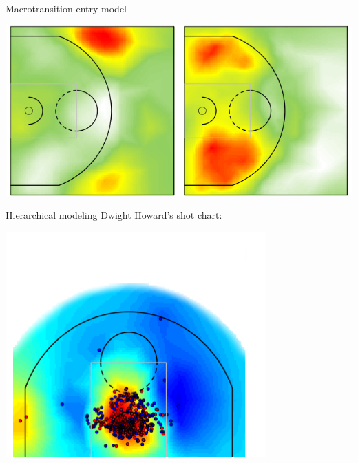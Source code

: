 \documentclass[10pt]{beamer}
\begin{document}
\begin{frame}{Macrotransition entry model}
{\begin{center}
\includegraphics[scale=0.32]{graphics/lebron_pass4_spatial_2}
\end{center}
}
\end{frame}

\begin{frame}{Hierarchical modeling}
Dwight Howard's shot chart:
\begin{center}
\includegraphics[width=0.75\textwidth]{graphics/howardshots1}
\end{center}
\end{frame}
\end{document}
